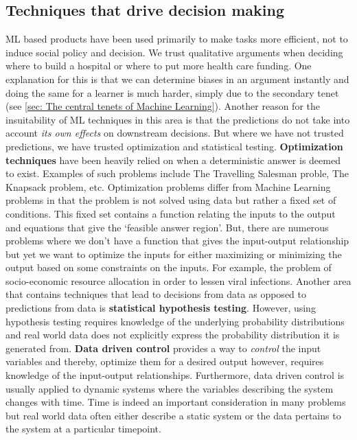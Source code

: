 \documentclass[12pt, letterpaper]{article}
\begin{document}
\subsection{Techniques that drive decision making}
ML based products have been used primarily to make tasks more efficient, not to induce social policy and decision.
We trust qualitative arguments when deciding where to build a hospital or where to put more health care funding.
One explanation for this is that we can determine biases in an argument instantly and doing the same for 
a learner is much harder, simply due to the secondary tenet (see \ref{sec: The central tenets of Machine 
Learning}). Another reason for the insuitability of ML techniques in this area is that the predictions do 
not take into account \textit{its own effects} on downstream decisions. But where we have not trusted 
predictions, we have trusted optimization and statistical testing. \textbf{Optimization techniques} have been heavily 
relied on when a deterministic answer is deemed to exist. Examples of such problems include The Travelling 
Salesman proble, The Knapsack problem, etc. Optimization problems
differ from Machine Learning problems in that the problem is not solved using data but rather a fixed set 
of conditions. This fixed set contains a function relating the inputs to the output and equations that 
give the `feasible answer region'. But, there are numerous problems where we don't have a function that 
gives the input-output relationship but yet we want to optimize the inputs for either maximizing or 
minimizing the output based on some constraints on the inputs. For example, the problem of socio-economic resource 
allocation in order to lessen viral infections. Another area that contains techniques that lead to decisions from 
data as opposed to predictions from data is \textbf{statistical hypothesis testing}. However, using hypothesis testing 
requires knowledge of the underlying probability distributions and real world data does not explicitly express the probability
distribution it is generated from. \textbf{Data driven control} provides a way to \textit{control} the input variables
and thereby, optimize them for a desired output however, requires knowledge of the input-output relationships. 
Furthermore, data driven control is usually applied to dynamic systems where the variables describing the system
changes with time. Time is indeed an important consideration in many problems but real world data often either 
describe a static system or the data pertains to the system at a particular timepoint. 
\end{document}
